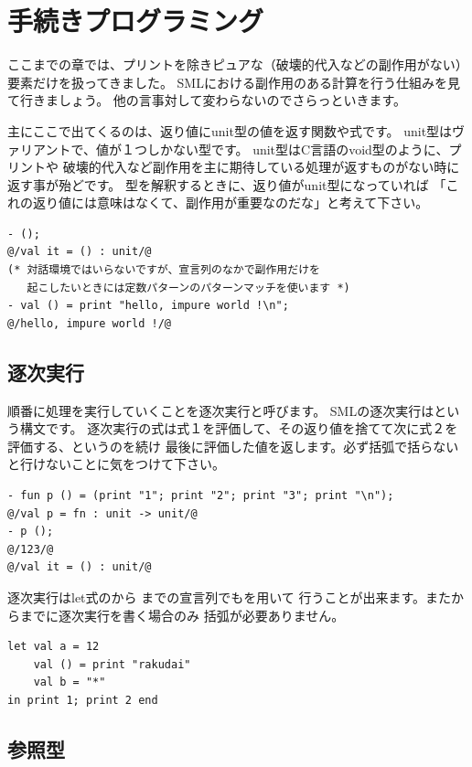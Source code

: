 \documentclass[11pt,a4paper]{article}
\begin{document}
\section{手続きプログラミング}

ここまでの章では、プリントを除きピュアな（破壊的代入などの副作用がない）要素だけを扱ってきました。
SMLにおける副作用のある計算を行う仕組みを見て行きましょう。
他の言事対して変わらないのでさらっといきます。

主にここで出てくるのは、返り値にunit型の値を返す関数や式です。
unit型はヴァリアントで、値が\prog{()}１つしかない型です。
unit型はC言語のvoid型のように、プリントや
破壊的代入など副作用を主に期待している処理が返すものがない時に返す事が殆どです。
型を解釈するときに、返り値がunit型になっていれば
「これの返り値には意味はなくて、副作用が重要なのだな」と考えて下さい。

\begin{lstlisting}
- ();
@/val it = () : unit/@
(* 対話環境ではいらないですが、宣言列のなかで副作用だけを
   起こしたいときには定数パターンのパターンマッチを使います *)
- val () = print "hello, impure world !\n";
@/hello, impure world !/@
\end{lstlisting}

\subsection{逐次実行}

順番に処理を実行していくことを逐次実行と呼びます。
SMLの逐次実行はという構文です。
逐次実行の式は式１を評価して、その返り値を捨てて次に式２を評価する、というのを続け
最後に評価した値を返します。必ず括弧で括らないと行けないことに気をつけて下さい。

\begin{lstlisting}[caption=逐次実行,label=code:sequence]
- fun p () = (print "1"; print "2"; print "3"; print "\n");
@/val p = fn : unit -> unit/@
- p ();
@/123/@
@/val it = () : unit/@
\end{lstlisting}

逐次実行はlet式のから
までの宣言列でもを用いて
行うことが出来ます。またからまでに逐次実行を書く場合のみ
括弧が必要ありません。

\begin{lstlisting}
let val a = 12
    val () = print "rakudai"
    val b = "*"
in print 1; print 2 end
\end{lstlisting}

\subsection{参照型}
\end{document}
